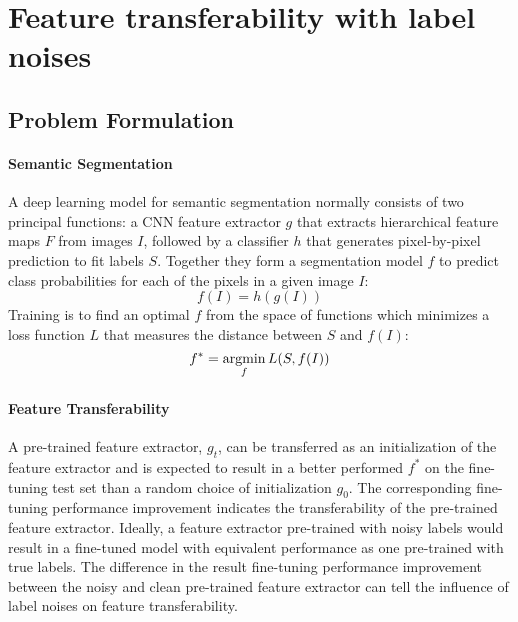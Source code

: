 \section{Feature transferability with label noises}
\label{sec:robustness}


\subsection{Problem Formulation}
\label{subsec:formulation}

\paragraph{Semantic Segmentation}
A deep learning model for semantic segmentation normally consists of two principal functions: a CNN feature extractor $g$ that extracts hierarchical feature maps $F$ from images $I$, followed by a classifier $h$ that generates pixel-by-pixel prediction to fit labels $S$.
Together they form a segmentation model $f$ to predict class probabilities for each of the pixels in a given image $I$:
$$f(I) = h(g(I))$$
Training is to find an optimal $f$ from the space of functions which minimizes a loss function $L$ that measures the distance between $S$ and $f(I)$:
$$f^{\ast} = \operatorname*{argmin}_{f}{L(S, f(I))}$$


\paragraph{Feature Transferability}
A pre-trained feature extractor, $g_t$, can be transferred as an initialization of the feature extractor and is expected to result in a better performed $f^{\ast}$ on the fine-tuning test set than a random choice of initialization $g_0$.
The corresponding fine-tuning performance improvement indicates the transferability of the pre-trained feature extractor.
Ideally, a feature extractor pre-trained with noisy labels would result in a fine-tuned model with equivalent performance as one pre-trained with true labels.
The difference in the result fine-tuning performance improvement between the noisy and clean pre-trained feature extractor can tell the influence of label noises on feature transferability.



